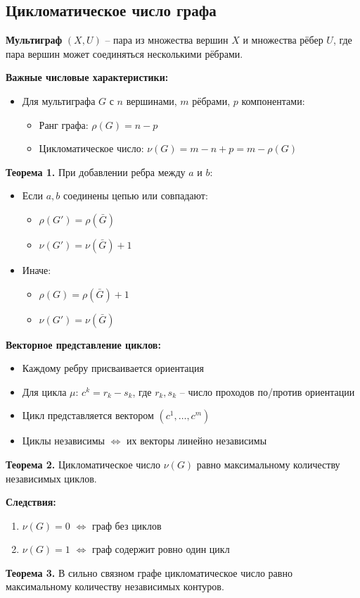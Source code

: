 \subsection{Цикломатическое число графа}

\noindent\textbf{Мультиграф} $(X,U)$ -- пара из множества вершин $X$ и множества рёбер $U$, где пара вершин может соединяться несколькими рёбрами.

\noindent\textbf{Важные числовые характеристики:}
\begin{itemize}
    \item Для мультиграфа $G$ с $n$ вершинами, $m$ рёбрами, $p$ компонентами:
    \begin{itemize}
        \item Ранг графа: $\rho(G) = n - p$
        \item Цикломатическое число: $\nu(G) = m - n + p = m - \rho(G)$
    \end{itemize}
\end{itemize}

\noindent\textbf{Теорема 1.} При добавлении ребра между $a$ и $b$:
\begin{itemize}
    \item Если $a,b$ соединены цепью или совпадают:
    \begin{itemize}
        \item $\rho(G') = \rho(\bar{G})$
        \item $\nu(G') = \nu(\bar{G}) + 1$
    \end{itemize}
    \item Иначе:
    \begin{itemize}
        \item $\rho(G) = \rho(\bar{G}) + 1$
        \item $\nu(G') = \nu(\bar{G})$
    \end{itemize}
\end{itemize}

\noindent\textbf{Векторное представление циклов:}
\begin{itemize}
    \item Каждому ребру присваивается ориентация
    \item Для цикла $\mu$: $c^k = r_k - s_k$, где $r_k,s_k$ -- число проходов по/против ориентации
    \item Цикл представляется вектором $(c^1,\ldots,c^m)$
    \item Циклы независимы $\Leftrightarrow$ их векторы линейно независимы
\end{itemize}

\noindent\textbf{Теорема 2.} Цикломатическое число $\nu(G)$ равно максимальному количеству независимых циклов.

\noindent\textbf{Следствия:}
\begin{enumerate}
    \item $\nu(G)=0$ $\Leftrightarrow$ граф без циклов
    \item $\nu(G)=1$ $\Leftrightarrow$ граф содержит ровно один цикл
\end{enumerate}

\noindent\textbf{Теорема 3.} В сильно связном графе цикломатическое число равно максимальному количеству независимых контуров.